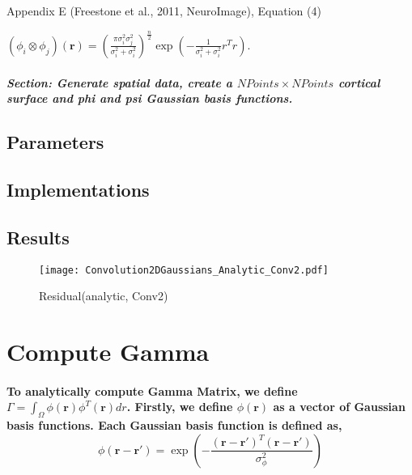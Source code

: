 \documentclass[a4paper, 12pt, english]{article}
\begin{document}
Appendix E (Freestone et al., 2011, NeuroImage), Equation (4)

$\left(\phi_{i}\otimes\phi_{j}\right)(\boldsymbol{r})=(\frac{\pi\sigma_{i}^{2}\sigma_{j}^{2}}{\sigma_{i}^{2}+\sigma_{i}^{2}})^{\frac{n}{2}}\exp(-\frac{1}{\sigma_{i}^{2}+\sigma_{i}^{2}}r^{T}r)$.

\subparagraph{Section: Generate spatial data, create a $NPoints\times NPoints$ cortical surface and phi and psi Gaussian basis functions.\\}


\subsection{Parameters}



\subsection{Implementations}



\subsection{Results}
\begin{figure}[H]
\centering
\texttt{[image: Convolution2DGaussians\_Analytic\_Conv2.pdf]}
\caption{Residual(analytic, Conv2)}\label{Convolution2DGaussians_Analytic_Conv2.pdf}
\end{figure}



\newpage




\section{Compute Gamma}

\paragraph{To analytically compute Gamma Matrix, we define
$\Gamma=\int_{\Omega}\phi(\boldsymbol{r})\phi^{T}(\boldsymbol{r})dr$.
Firstly, we define $\phi(\boldsymbol{r})$ as a vector of Gaussian basis functions.
Each Gaussian basis function is defined as,
$$\phi(\boldsymbol{r}-\boldsymbol{r}\prime)=\exp{\left(-\frac{(\boldsymbol{r}-\boldsymbol{r}\prime)^{T}(\boldsymbol{r}-\boldsymbol{r}\prime)}{\sigma_{\phi}^{2}}\right)}$$}
\end{document}
